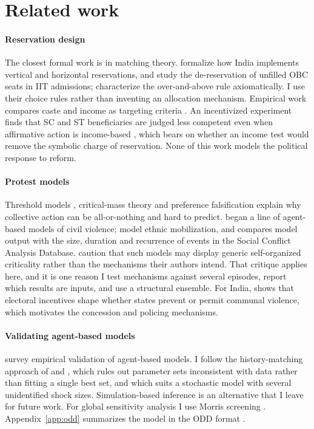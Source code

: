 \documentclass[11pt,a4paper]{article}
\begin{document}
\section{Related work}
\label{sec:related}

\paragraph{Reservation design} The closest formal work is in matching theory. \citet{sonmez2022} formalize how India implements vertical and horizontal reservations, and \citet{aygun2020,aygun2023deres} study the de-reservation of unfilled OBC seats in IIT admissions; \citet{aygun2023characterization} characterize the over-and-above rule axiomatically. I use their choice rules rather than inventing an allocation mechanism. Empirical work compares caste and income as targeting criteria \citep{bertrand2010,deshpande2019epw,deshpande2019wd}. An incentivized experiment finds that SC and ST beneficiaries are judged less competent even when affirmative action is income-based \citep{deshpande2026merit}, which bears on whether an income test would remove the symbolic charge of reservation. None of this work models the political response to reform.

\paragraph{Protest models} Threshold models \citep{granovetter1978,schelling1978}, critical-mass theory \citep{marwell1993} and preference falsification \citep{kuran1991} explain why collective action can be all-or-nothing and hard to predict. \citet{epstein2002} began a line of agent-based models of civil violence; \citet{srbljinovic2003} model ethnic mobilization, and \citet{lemos2018} compares model output with the size, duration and recurrence of events in the Social Conflict Analysis Database. \citet{thron2015} caution that such models may display generic self-organized criticality rather than the mechanisms their authors intend. That critique applies here, and it is one reason I test mechanisms against several episodes, report which results are inputs, and use a structural ensemble. For India, \citet{wilkinson2004} shows that electoral incentives shape whether states prevent or permit communal violence, which motivates the concession and policing mechanisms.

\paragraph{Validating agent-based models} \citet{windrum2007} survey empirical validation of agent-based models. I follow the history-matching approach of \citet{vernon2010} and \citet{andrianakis2015}, which rules out parameter sets inconsistent with data rather than fitting a single best set, and which suits a stochastic model with several unidentified shock sizes. Simulation-based inference \citep{cranmer2020} is an alternative that I leave for future work. For global sensitivity analysis I use Morris screening \citep{morris1991,campolongo2007,saltelli2008}. Appendix~\ref{app:odd} summarizes the model in the ODD format \citep{grimm2020}.
\end{document}
